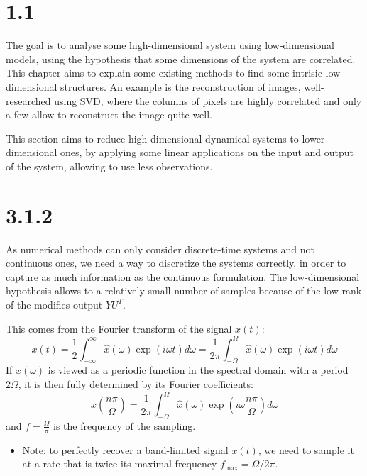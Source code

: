 \section*{1.1}
The goal is to analyse some high-dimensional system using low-dimensional models, using the hypothesis that some dimensions of the system are correlated. This chapter aims to explain some existing methods to find some intrisic low-dimensional structures. An example is the reconstruction of images, well-researched using SVD, where the columns of pixels are highly correlated and only a few allow to reconstruct the image quite well. 

This section aims to reduce high-dimensional dynamical systems to lower-dimensional ones, by applying some linear applications on the input and output of the system, allowing to use less observations. 

\section*{3.1.2}
As numerical methods can only consider discrete-time systems and not continuous ones, we need a way to discretize the systems correctly, in order to capture as much information as the continuous formulation. The low-dimensional hypothesis allows to a relatively small number of samples because of the low rank of the modifies output $YU^T$. 

This comes from the Fourier transform of the signal $x(t)$:
\begin{equation}
    x(t) = \frac{1}{2}\int_{-\infty}^\infty \hat x(\omega)\exp{(i\omega t)}d\omega = \frac{1}{2\pi} \int_{-\Omega}^\Omega \hat x(\omega) \exp{(i\omega t)}d\omega 
\end{equation}
If $\hat x(\omega)$ is viewed as a periodic function in the spectral domain with a period $2\Omega$, it is then fully determined by its Fourier coefficients: 
\begin{equation}
    x\left(\frac{n\pi}{\Omega}\right) = \frac{1}{2\pi}\int_{-\Omega}^{\Omega} \hat x(\omega) \exp{\left(i\omega \frac{n\pi}{\Omega}\right)}d\omega
\end{equation}
and $f=\frac{\Omega}{\pi}$ is the frequency of the sampling. 
\begin{itemize}
    \item [$\bullet$] Note: to perfectly recover a band-limited signal $x(t)$, we need to sample it at a rate that is twice its maximal frequency $f_{\max} = \Omega/2\pi$.
\end{itemize}

